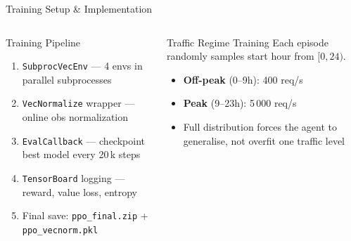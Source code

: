 \documentclass[aspectratio=169]{beamer}
\begin{document}
\begin{frame}{Training Setup \& Implementation}
\begin{columns}[T]
      \begin{block}{Training Pipeline}
        \begin{enumerate}\itemsep3pt
          \item \texttt{SubprocVecEnv} — 4 envs in parallel subprocesses
          \item \texttt{VecNormalize} wrapper — online obs normalization
          \item \texttt{EvalCallback} — checkpoint best model every 20\,k steps
          \item \texttt{TensorBoard} logging — reward, value loss, entropy
          \item Final save: \texttt{ppo\_final.zip} + \texttt{ppo\_vecnorm.pkl}
        \end{enumerate}
      \end{block}
      \vspace{4pt}
      \begin{block}{Traffic Regime Training}
        Each episode randomly samples start hour from $[0,24)$.\\[3pt]
        \begin{itemize}
          \item \textbf{Off-peak} (0--9h): 400 req/s
          \item \textbf{Peak} (9--23h): 5\,000 req/s
          \item Full distribution forces the agent to generalise, not overfit
                one traffic level
        \end{itemize}
      \end{block}
  \end{columns}
\end{frame}
\end{document}

